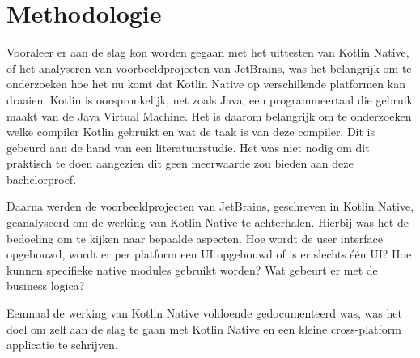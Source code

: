 
\chapter{Methodologie}
\label{ch:methodologie}


Vooraleer er aan de slag kon worden gegaan met het uittesten van Kotlin Native, of het analyseren van voorbeeldprojecten van JetBrains, was het belangrijk om te onderzoeken hoe het nu komt dat Kotlin Native op verschillende platformen kan draaien. Kotlin is oorspronkelijk, net zoals Java, een programmeertaal die gebruik maakt van de Java Virtual Machine. Het is daarom belangrijk om te onderzoeken welke compiler Kotlin gebruikt en wat de taak is van deze compiler. Dit is gebeurd aan de hand van een literatuurstudie. Het was niet nodig om dit praktisch te doen aangezien dit geen meerwaarde zou bieden aan deze bachelorproef.

Daarna werden de voorbeeldprojecten van JetBrains, geschreven in Kotlin Native, geanalyseerd om de werking van Kotlin Native te achterhalen. Hierbij was het de bedoeling om te kijken naar bepaalde aspecten. Hoe wordt de user interface opgebouwd, wordt er per platform een UI opgebouwd of is er slechts één UI? Hoe kunnen specifieke native modules gebruikt worden? Wat gebeurt er met de business logica?

Eenmaal de werking van Kotlin Native voldoende gedocumenteerd was, was het doel om zelf aan de slag te gaan met Kotlin Native en een kleine cross-platform applicatie te schrijven.

